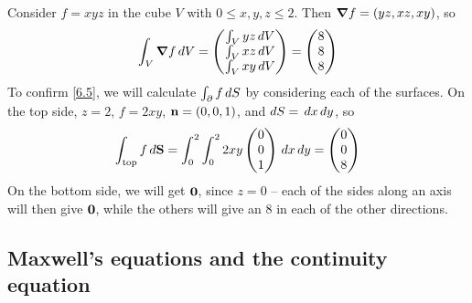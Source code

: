 \documentclass{../template/note}
\begin{document}
    \begin{example*}
        Consider \(f = xyz\) in the cube \(V\) with \(0 \leq x, y, z \leq 2\). Then \(\grad f = (yz, xz, xy)\), so
        \begin{align*}
            \int_V \grad f \D V = \begin{pmatrix}
             \int_V yz \D V \\
             \int_V xz \D V \\
             \int_V xy \D V \\
            \end{pmatrix} = \begin{pmatrix}
             8 \\
             8 \\
             8 \\
            \end{pmatrix}
        \end{align*}
        To confirm \cref{6.5}, we will calculate \(\int_{\partial} f \,d{S}\) by considering each of the surfaces. On the top side, \(z=2\), \(f=2xy\), \(\V n = (0, 0, 1)\), and \(dS = \,d{x} \,d{y}\), so
        \begin{align*}
            \int_\text{top} f \, d\V S = \int_0^2 \int_0^2 2xy \begin{pmatrix}
             0 \\
             0 \\
             1 \\
            \end{pmatrix} \D x \D y = \begin{pmatrix}
             0 \\
             0 \\
             8 \\
            \end{pmatrix}
        \end{align*}
        On the bottom side, we will get \(\V 0\), since \(z=0\) -- each of the sides along an axis will then give \(\V 0\), while the others will give an 8 in each of the other directions.       
    \end{example*}
    
    \subsection{Maxwell's equations and the continuity equation}
\end{document}
